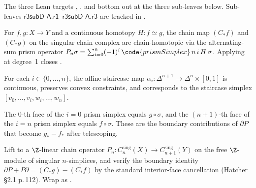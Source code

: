 \begin{theorem}
\label{input:prism-and-surface-h1}
The three Lean targets
,
, and
 bottom out at the three
sub-leaves below.  Sub-leaves
\(\textsf{r3subD-A.r1}\)--\(\textsf{r3subD-A.r3}\) are tracked in
.
\leanok
\end{theorem}

\begin{lemma}
\label{lem:r3subD-prism-chain-homotopy}
For \(f,g:X\to Y\) and a continuous homotopy \(H:f\simeq g\), the
chain map \((C_{*}f)\) and \((C_{*}g)\) on the singular chain complex
are chain-homotopic via the alternating-sum prism operator
\(P_{n}\sigma=\sum_{i=0}^{n}(-1)^{i}\,\code{prismSimplex}\,n\,i\,H\,\sigma\).
Applying  at degree~1 closes
.
\leanok
\end{lemma}

\begin{lemma}
\label{lem:r3subD-A-r1}
For each \(i\in\{0,\dots,n\}\), the affine staircase map
\(\alpha_{i}:\Delta^{n+1}\to\Delta^{n}\times[0,1]\) is continuous,
preserves convex constraints, and corresponds to the staircase simplex
\([v_{0},\dots,v_{i},w_{i},\dots,w_{n}]\).
\leanok
\end{lemma}

\begin{lemma}
\label{lem:r3subD-A-r2}
The 0-th face of the \(i=0\) prism simplex equals \(g\circ\sigma\),
and the \((n+1)\)-th face of the \(i=n\) prism simplex equals \(f\circ\sigma\).
These are the boundary contributions of \(\partial P\) that become
\(g_{*}-f_{*}\) after telescoping.
\leanok
\end{lemma}

\begin{lemma}
\label{lem:r3subD-A-r3}
Lift  to a \(\Z\)-linear chain operator
\(P_{n}:C^{\mathrm{sing}}_{n}(X)\to C^{\mathrm{sing}}_{n+1}(Y)\)
on the free \(\Z\)-module of singular \(n\)-simplices, and verify the
boundary identity \(\partial P + P\partial = (C_{*}g)-(C_{*}f)\) by
the standard interior-face cancellation
(Hatcher \S2.1 p.\,112).  Wrap as
.
\leanok
\end{lemma}

